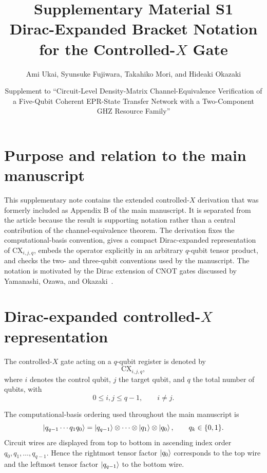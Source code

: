\documentclass[11pt,a4paper]{article}
\title{Supplementary Material S1\\[1mm]
\large Dirac-Expanded Bracket Notation for the Controlled-$X$ Gate}
\author{Ami Ukai, Syunsuke Fujiwara, Takahiko Mori, and Hideaki Okazaki}
\date{Supplement to ``Circuit-Level Density-Matrix Channel-Equivalence Verification of a Five-Qubit Coherent EPR-State Transfer Network with a Two-Component GHZ Resource Family''}
\newcommand{\CX}{\mathrm{CX}}
\begin{document}
\maketitle

\section*{Purpose and relation to the main manuscript}
This supplementary note contains the extended controlled-$X$ derivation that was formerly included as Appendix B of the main manuscript.  It is separated from the article because the result is supporting notation rather than a central contribution of the channel-equivalence theorem.  The derivation fixes the computational-basis convention, gives a compact Dirac-expanded representation of $\CX_{i,j,q}$, embeds the operator explicitly in an arbitrary $q$-qubit tensor product, and checks the two- and three-qubit conventions used by the manuscript.  The notation is motivated by the Dirac extension of CNOT gates discussed by Yamanashi, Ozawa, and Okazaki~\cite{Yamanashi2023}.

\section{Dirac-expanded controlled-$X$ representation}

The controlled-$X$ gate acting on a $q$-qubit register is denoted by
\begin{equation}
\boxed{\CX_{i,j,q}},
\end{equation}
where $i$ denotes the control qubit, $j$ the target qubit, and $q$ the total number of qubits, with
\begin{equation}
0\le i,j\le q-1,\qquad i\neq j.
\end{equation}

The computational-basis ordering used throughout the main manuscript is
\begin{equation}
\ket{q_{q-1}\cdots q_1q_0}
=
\ket{q_{q-1}}\otimes\cdots\otimes\ket{q_1}\otimes\ket{q_0},
\qquad q_k\in\{0,1\}.
\label{eq:Sordering}
\end{equation}
Circuit wires are displayed from top to bottom in ascending index order $q_0,q_1,\ldots,q_{q-1}$.  Hence the rightmost tensor factor $\ket{q_0}$ corresponds to the top wire and the leftmost tensor factor $\ket{q_{q-1}}$ to the bottom wire.
\end{document}
